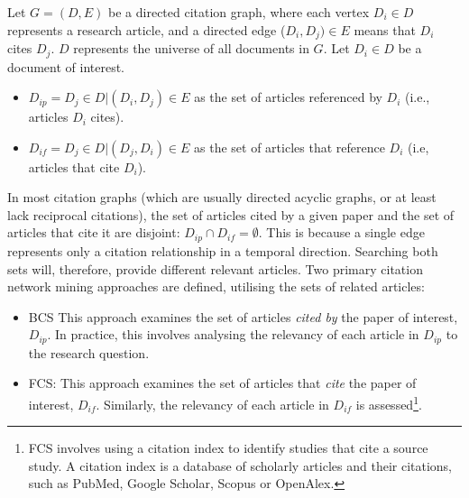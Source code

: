 \documentclass[10pt,oneside]{book}
\begin{document}
\begin{tcolorbox}[title=Citation Network Definitions] 
\small
Let $G = (D, E)$ be a directed citation graph, where each vertex $D_i \in D$ represents a research article, and a directed edge ($D_i, D_j) \in E$ means that $D_i$ cites $D_j$. $D$ represents the universe of all documents in $G$. Let $D_i \in D$ be a document of interest. 

\begin{itemize}
    \item $D_{ip} = {D_j \in D | (D_i, D_j) \in E}$ as the set of articles referenced by $D_i$ (i.e., articles $D_i$ cites). 
    \item $D_{if} = {D_j \in D | (D_j, D_i) \in E}$ as the set of articles that reference $D_i$ (i.e, articles that cite $D_i$).

\end{itemize}

In most citation graphs (which are usually directed acyclic graphs, or at least lack reciprocal citations), the set of articles cited by a given paper and the set of articles that cite it are disjoint: $D_{ip} \cap D_{if} = \emptyset$. This is because a single edge represents only a citation relationship in a temporal direction. Searching both sets will, therefore, provide different relevant articles.
\newline
\newline
Two primary citation network mining approaches are defined, utilising the sets of related articles:

\begin{itemize}
    \item BCS  This approach examines the set of articles \emph{cited by} the paper of interest, $D_{ip}$.  In practice, this involves analysing the relevancy of each article in $D_{ip}$ to the research question. \cite{lefebvre_cochrane_2011, akers2009systematic}
    \item FCS: This approach examines the set of articles that \emph{cite} the paper of interest, $D_{if}$.  Similarly, the relevancy of each article in $D_{if}$ is assessed\footnote{FCS involves using a citation index to identify studies that cite a source study. A citation index is a database of scholarly articles and their citations, such as PubMed, Google Scholar, Scopus or OpenAlex.}.
\end{itemize}

\end{tcolorbox}
\end{document}
